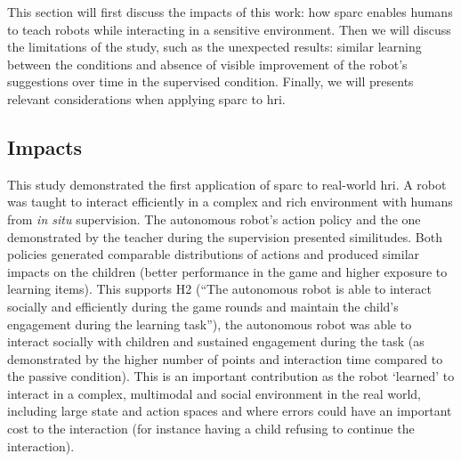 This section will first discuss the impacts of this work: how \gls{sparc} enables humans to teach robots while interacting in a sensitive environment. Then we will discuss the limitations of the study, such as  the unexpected results: similar learning between the conditions and absence of visible improvement of the robot's suggestions over time in the supervised condition. Finally, we will presents relevant considerations when applying \gls{sparc} to \gls{hri}.

\subsection{Impacts} \label{sec:tutoring_opportunities}



This study demonstrated the first application of \gls{sparc} to real-world \gls{hri}. A robot was taught to interact efficiently in a complex and rich environment with humans from \textit{in situ} supervision. The autonomous robot's action policy and the one demonstrated by the teacher during the supervision presented similitudes. Both policies generated comparable distributions of actions and produced similar impacts on the children (better performance in the game and higher exposure to learning items). This supports H2 (``The autonomous robot is able to interact socially and efficiently during the game rounds and maintain the child’s engagement during the learning task''), the autonomous robot was able to interact socially with children and sustained engagement during the task (as demonstrated by the higher number of points and interaction time compared to the passive condition). This is an important contribution as the robot `learned' to interact in a complex, multimodal and social environment in the real world, including large state and action spaces and where errors could have an important cost to the interaction (for instance having a child refusing to continue the interaction). %

